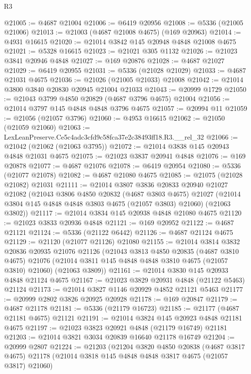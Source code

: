 \begin{lexlean}{R3}
\begin{coremodule}
@21005 := @4687 @21004
@21006 := @6419 @20956
@21008 := @5336 (@21005 @21006)
@21013 := @21003 (@4687 @21008 @4675) (@169 @20963)
@21014 := @4931 @16615
@21020 := @21014 @3842 @145 @20948 @4848 @21008 @4675
@21021 := @5328 @16615
@21023 := @21021 @305 @1132
@21026 := @21023 @3841 @20946 @4848
@21027 := @169 @20876
@21028 := @4687 @21027
@21029 := @6419 @20955
@21031 := @5336 (@21028 @21029)
@21033 := @4687 @21031 @4675
@21036 := @21026 (@21005 @21033) @21008
@21042 := @21014 @3800 @3840 @20830 @20945 @21004 @21033
@21043 := @20999 @1729
@21050 := @21043 @3799 @4850 @20829 (@4687 @3796 @4675) @21004
@21056 := @21014 @3797 @145 @4848 @4848 @3796 @4675
@21057 := @20994 @11
@21059 := @21056 (@21057 @3796)
@21060 := @4953 @16615
@21062 := @21050 (@21059 @21060)
@21063 := LexLeanPreserve.Ce5c4adc3cfd9c58fca37e2c38493ff18.R3.__rel_32
@21066 := @21042 (@21062 (@21063 @3795))
@21072 := @21014 @3838 @145 @20943 @4848 @21031 @4675
@21075 := @21023 @3837 @20941 @4848
@21076 := @169 @20878
@21077 := @4687 @21076
@21078 := @6419 @20954
@21080 := @5336 (@21077 @21078)
@21082 := @4687 @21080 @4675
@21085 := @21075 (@21028 @21082) @21031
@21111 := @21014
    @3807
    @3836
    @20833
    @20940
    @21027
    @21082
    (@21043
      @3806
      @4850
      @20832
      (@4687 @3803 @4675)
      @21027
      (@21014 @3804 @145 @4848 @4848 @3803 @4675 (@21057 @3803) @21060)
      (@21063 @3802))
@21117 := @21014 @3834 @145 @20938 @4848 @21080 @4675
@21120 := @21023 @3833 @20936 @4848
@21121 := @169 @20952
@21122 := @4687 @21121
@21124 := @5336 (@21122 @6442)
@21126 := @4687 @21124 @4675
@21129 := @21120 (@21077 @21126) @21080
@21155 := @21014
    @3814
    @3832
    @20836
    @20935
    @21076
    @21126
    (@21043
      @3813
      @4850
      @20835
      (@4687 @3810 @4675)
      @21076
      (@21014 @3811 @145 @4848 @4848 @3810 @4675 (@21057 @3810) @21060)
      (@21063 @3809))
@21161 := @21014 @3830 @145 @20933 @4848 @21124 @4675
@21167 := @21023 @3829 @20931 @4848 (@21122 @5463) @21124
@21173 := @21014 @3827 @1146 @20929 @4852 @21121 @5463
@21177 := @20999 @2802 @3826 @20925 @20928
@21178 := @169 @20847
@21179 := @4687 @21178
@21181 := @5336 (@21179 @16723)
@21185 := @21177 (@4687 @21181 @4675) @21121
@21191 := @21014 @3824 @145 @20923 @4848 @21181 @4675
@21197 := @21023 @3823 @20921 @4848 (@21179 @16749) @21181
@21203 := @21014 @3821 @3034 @20839 @16640 @21178 @16749
@21204 := @20999 @2807
@21224 := @21203
    (@21204
      @3820
      @4850
      @20838
      (@4687 @3817 @4675)
      @21178
      (@21014 @3818 @145 @4848 @4848 @3817 @4675 (@21057 @3817) @21060)

\end{coremodule}
\end{lexlean}
